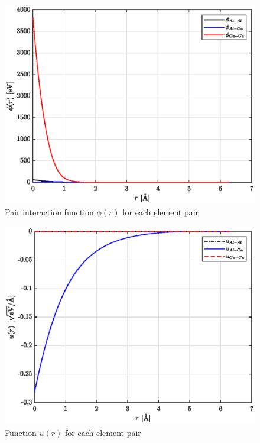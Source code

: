 \documentclass{article}
\begin{document}
\begin{figure}[h!]
	\centering
	\includegraphics[scale=0.6]{Figures/phi_AlCu.eps}
	\caption{Pair interaction function $\phi(r)$ for each element pair}
\end{figure}

\begin{figure}[h!]
	\centering
	\includegraphics[scale=0.6]{Figures/u_AlCu.eps}
	\caption{Function $u(r)$ for each element pair}
\end{figure}
\end{document}
